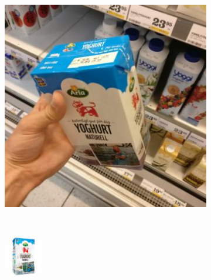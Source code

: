 \begin{figure}[t]
\begin{subfigure}[b]{0.18\textwidth}
		\caption{}
		\label{subfig:onion-decoded}
	\end{subfigure} ~~~
	\begin{subfigure}[b]{0.18\textwidth}
		\centering
		\includegraphics[width=\textwidth]{PaperA/decoded-image-figure/Arla-Natural-Yoghurt_014.jpg}
		\caption{}
		\label{subfig:yogurt-natural}
	\end{subfigure} ~
	\begin{subfigure}[b]{0.18\textwidth}
		\centering
		\includegraphics[width=\textwidth]{PaperA/decoded-image-figure/densenet_nov11/Arla-Natural-Yoghurt_decoded.png}

\end{subfigure}
\end{figure}
